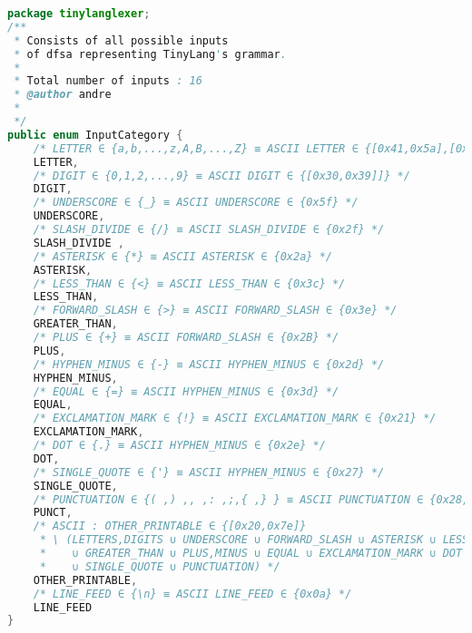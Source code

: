 \begin{lstlisting}[basicstyle=\miniscule,language=Java,caption=Implementation of classifier table,label=listing:classifier table]
package tinylanglexer;
/**
 * Consists of all possible inputs
 * of dfsa representing TinyLang's grammar.
 * 
 * Total number of inputs : 16
 * @author andre
 *
 */
public enum InputCategory {
	/* LETTER ∈ {a,b,...,z,A,B,...,Z} ≡ ASCII LETTER ∈ {[0x41,0x5a],[0x61,0x7a]} */
	LETTER,
	/* DIGIT ∈ {0,1,2,...,9} ≡ ASCII DIGIT ∈ {[0x30,0x39]]} */
	DIGIT,
	/* UNDERSCORE ∈ {_} ≡ ASCII UNDERSCORE ∈ {0x5f} */	
	UNDERSCORE,
	/* SLASH_DIVIDE ∈ {/} ≡ ASCII SLASH_DIVIDE ∈ {0x2f} */		
	SLASH_DIVIDE ,
	/* ASTERISK ∈ {*} ≡ ASCII ASTERISK ∈ {0x2a} */
	ASTERISK,
	/* LESS_THAN ∈ {<} ≡ ASCII LESS_THAN ∈ {0x3c} */
	LESS_THAN,
	/* FORWARD_SLASH ∈ {>} ≡ ASCII FORWARD_SLASH ∈ {0x3e} */
	GREATER_THAN,
	/* PLUS ∈ {+} ≡ ASCII FORWARD_SLASH ∈ {0x2B} */
	PLUS,
	/* HYPHEN_MINUS ∈ {-} ≡ ASCII HYPHEN_MINUS ∈ {0x2d} */
	HYPHEN_MINUS,
	/* EQUAL ∈ {=} ≡ ASCII HYPHEN_MINUS ∈ {0x3d} */
	EQUAL,
	/* EXCLAMATION_MARK ∈ {!} ≡ ASCII EXCLAMATION_MARK ∈ {0x21} */
	EXCLAMATION_MARK,
	/* DOT ∈ {.} ≡ ASCII HYPHEN_MINUS ∈ {0x2e} */
	DOT,
	/* SINGLE_QUOTE ∈ {'} ≡ ASCII HYPHEN_MINUS ∈ {0x27} */
	SINGLE_QUOTE,
	/* PUNCTUATION ∈ {( ,) ,, ‚: ,;,{ ,} } ≡ ASCII PUNCTUATION ∈ {0x28, 0x29,0x2c, 0x3a, 0x3b,0x7b ,0x7d} */
	PUNCT,
	/* ASCII : OTHER_PRINTABLE ∈ {[0x20,0x7e]} 
	 * \ (LETTERS,DIGITS ∪ UNDERSCORE ∪ FORWARD_SLASH ∪ ASTERISK ∪ LESS_THAN
	 * 	  ∪ GREATER_THAN ∪ PLUS,MINUS ∪ EQUAL ∪ EXCLAMATION_MARK ∪ DOT
	 *    ∪ SINGLE_QUOTE ∪ PUNCTUATION) */
	OTHER_PRINTABLE,
	/* LINE_FEED ∈ {\n} ≡ ASCII LINE_FEED ∈ {0x0a} */
	LINE_FEED
}
\end{lstlisting}
